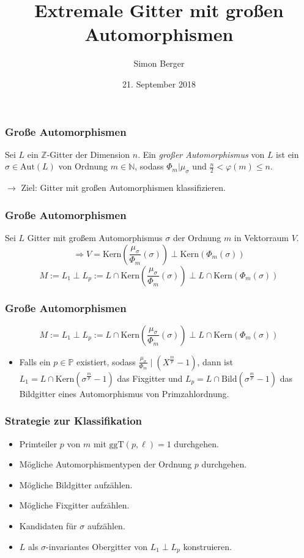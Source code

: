 \documentclass{beamer}
\title{Extremale Gitter mit großen Automorphismen}
\author{Simon Berger}
\date{21. September 2018}
\newcommand{\N}{\mathbb{N}}
\newcommand{\Z}{\mathbb{Z}}
\renewcommand{\P}{\mathbb{P}}
\newcommand{\Kern}{\text{Kern}}
\newcommand{\Bild}{\text{Bild}}
\newcommand{\ggT}{\text{ggT}}
\newcommand{\Aut}{\text{Aut}}
\begin{document}
\begin{frame}[plain]
	\titlepage
\end{frame}

\begin{frame}[plain]
	\frametitle{Große Automorphismen}
	\begin{Definition}
		Sei $L$ ein $\Z$-Gitter der Dimension $n$. Ein \textit{großer Automorphismus} von $L$ ist ein $\sigma \in \Aut(L)$ von Ordnung $m \in \N$, sodass $\Phi_m \vert \mu_\sigma$ und $\frac{n}{2} < \varphi(m) \leq n$.
	\end{Definition}
	\pause
	\par
	$\rightarrow$ Ziel: Gitter mit großen Automorphismen klassifizieren.
\end{frame}

\begin{frame}[plain]
	\frametitle{Große Automorphismen}
	Sei $L$ Gitter mit großem Automorphismus $\sigma$ der Ordnung $m$ in Vektorraum $V$.
	\pause
	\[\Rightarrow V = \Kern(\frac{\mu_\sigma}{\Phi_m}(\sigma)) \perp \Kern(\Phi_m(\sigma))\]
	\[ M := L_1 \perp L_p := L \cap \Kern(\frac{\mu_\sigma}{\Phi_m}(\sigma)) \perp L \cap \Kern(\Phi_m(\sigma))\]
\end{frame}

\begin{frame}[plain]
	\frametitle{Große Automorphismen}
	\[ M := L_1 \perp L_p := L \cap \Kern(\frac{\mu_\sigma}{\Phi_m}(\sigma)) \perp L \cap \Kern(\Phi_m(\sigma))\]
	\begin{itemize}
		\item Falls ein $p \in \P$ existiert, sodass $\frac{\mu_\sigma}{\Phi_m} \mid (X^\frac{m}{p} - 1)$, dann ist $L_1 = L \cap \Kern(\sigma^\frac{m}{p}-1)$ das Fixgitter und $L_p = L \cap \Bild(\sigma^\frac{m}{p} - 1)$ das Bildgitter eines Automorphismus von Primzahlordnung.
	\end{itemize}
\end{frame}

\begin{frame}[plain]
	\frametitle{Strategie zur Klassifikation}
	\begin{itemize}
		\item Primteiler $p$ von $m$ mit $\ggT(p,\ell) = 1$ durchgehen.
		\pause
		\item Mögliche Automorphismentypen der Ordnung $p$ durchgehen.
		\pause
		\item Mögliche Bildgitter aufzählen.
		\pause
		\item Mögliche Fixgitter aufzählen.
		\pause
		\item Kandidaten für $\sigma$ aufzählen.
		\pause
		\item $L$ als $\sigma$-invariantes Obergitter von $L_1 \perp L_p$ konstruieren.
	\end{itemize}
\end{frame}
\end{document}

